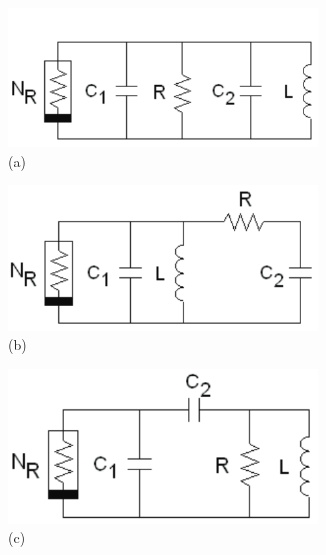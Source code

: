 \documentclass[12pt]{article}
\begin{document}
\begin{figure}[H] %
	\centering
	\caption{Fig 1. Possible configurations for the circuit}
	\begin{subfigure}[b]{0.5\textwidth}
		\centering
		\includegraphics[width=0.9\textwidth]{Images/fig1(a).png}
		\caption{(a)}
		\label{fig:1a}
	\end{subfigure}%
	\begin{subfigure}[b]{0.5\textwidth}
		\centering
		\includegraphics[width=0.9\textwidth]{Images/fig1(b).png}
		\caption{(b)}
		\label{fig:1b}
	\end{subfigure}
	\begin{subfigure}[b]{0.5\textwidth}
		\centering
		\includegraphics[width=0.9\textwidth]{Images/fig1(c).png}
		\caption{(c)}
		\label{fig:1c}
	\end{subfigure}%
	\begin{subfigure}[b]{0.5\textwidth}

\end{subfigure}
\end{figure}
\end{document}
